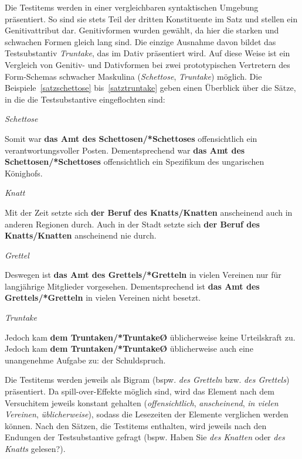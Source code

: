 Die Testitems werden in einer vergleichbaren syntaktischen Umgebung präsentiert. So sind sie stets Teil der dritten Konstituente im Satz und stellen ein Genitivattribut dar. Genitivformen wurden gewählt, da hier die starken und schwachen Formen gleich lang sind. Die einzige Ausnahme davon bildet das Testsubstantiv \textit{Truntake}, das im Dativ präsentiert wird. Auf diese Weise ist ein Vergleich von Genitiv- und Dativformen bei zwei prototypischen Vertretern des Form-Schemas schwacher Maskulina (\textit{Schettose}, \textit{Truntake}) möglich. Die Beispiele~\ref{satzschettose} bis~\ref{satztruntake} geben einen Überblick über die Sätze, in die die Testsubstantive eingeflochten sind:

\begin{exe} 
\ex \label{satzschettose} \textit{Schettose} 
\begin{xlist}
\ex Somit war \textbf{das Amt des Schettosen/*Schettoses} offensichtlich ein verantwortungsvoller Posten.
\ex\sloppy Dementsprechend war \textbf{das Amt des Schettosen/*Schettoses} offensichtlich ein Spezifikum des ungarischen Könighofs.
\end{xlist}
\ex \textit{Knatt} \begin{xlist}
\ex Mit der Zeit setzte sich \textbf{der Beruf des Knatts/Knatten} anscheinend auch in anderen Regionen durch.
\ex Auch in der Stadt setzte sich \textbf{der Beruf des Knatts/Knatten} anscheinend nie durch.  
\end{xlist} 
\ex \label{satzgrettel}  \textit{Grettel} 
\begin{xlist}
\ex Deswegen ist \textbf{das Amt des Grettels/*Gretteln} in vielen Vereinen nur für langjährige Mitglieder vorgesehen. 
\ex Dementsprechend ist \textbf{das Amt des Grettels/*Gretteln} in vielen Vereinen nicht besetzt.   
\end{xlist}
\ex \label{satztruntake} \textit{Truntake}
\begin{xlist}
\ex Jedoch kam \textbf{dem Truntaken/*TruntakeØ} üblicherweise keine Urteilskraft zu.
\ex Jedoch kam \textbf{dem Truntaken/*TruntakeØ} üblicherweise auch eine unangenehme Aufgabe zu: der Schuldspruch.
\end{xlist}
\end{exe}\largerpage

Die Testitems werden jeweils als Bigram (bspw. \textit{des Gretteln} bzw. \textit{des Grettels}) präsentiert. Da spill-over-Effekte möglich sind, wird das Element nach dem Versuchitem jeweils konstant gehalten (\textit{offensichtlich}, \textit{anscheinend}, \textit{in vielen Vereinen}, \textit{üblicherweise}), sodass die Lesezeiten der Elemente verglichen werden können. Nach den Sätzen, die Testitems enthalten, wird jeweils nach den Endungen der Testsubstantive gefragt (bspw. Haben Sie \textit{des Knatten} oder \textit{des Knatts} gelesen?). 

